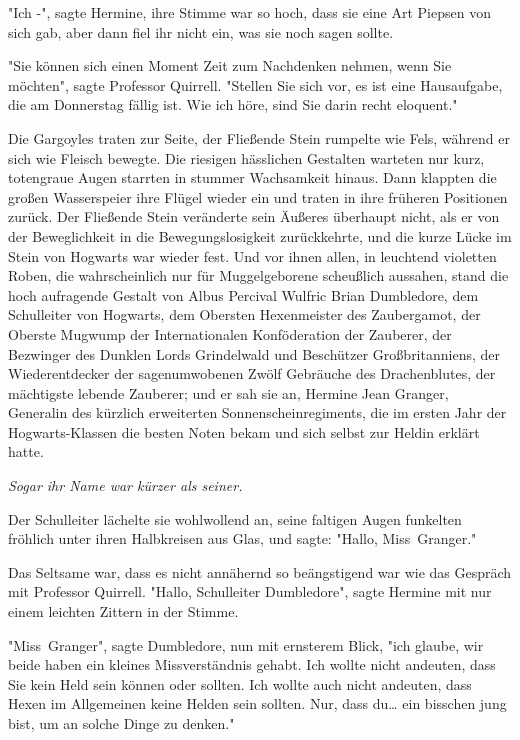 {"Ich -", sagte Hermine, ihre Stimme war so hoch, dass sie eine Art Piepsen von sich gab, aber dann fiel ihr nicht ein, was sie noch sagen sollte.

"Sie können sich einen Moment Zeit zum Nachdenken nehmen, wenn Sie möchten", sagte Professor Quirrell. "Stellen Sie sich vor, es ist eine Hausaufgabe, die am Donnerstag fällig ist. Wie ich höre, sind Sie darin recht eloquent."

Die Gargoyles traten zur Seite, der Fließende Stein rumpelte wie Fels, während er sich wie Fleisch bewegte. Die riesigen hässlichen Gestalten warteten nur kurz, totengraue Augen starrten in stummer Wachsamkeit hinaus. Dann klappten die großen Wasserspeier ihre Flügel wieder ein und traten in ihre früheren Positionen zurück. Der Fließende Stein veränderte sein Äußeres überhaupt nicht, als er von der Beweglichkeit in die Bewegungslosigkeit zurückkehrte, und die kurze Lücke im Stein von Hogwarts war wieder fest. Und vor ihnen allen, in leuchtend violetten Roben, die wahrscheinlich nur für Muggelgeborene scheußlich aussahen, stand die hoch aufragende Gestalt von Albus Percival Wulfric Brian Dumbledore, dem Schulleiter von Hogwarts, dem Obersten Hexenmeister des Zaubergamot, der Oberste Mugwump der Internationalen Konföderation der Zauberer, der Bezwinger des Dunklen Lords Grindelwald und Beschützer Großbritanniens, der Wiederentdecker der sagenumwobenen Zwölf Gebräuche des Drachenblutes, der mächtigste lebende Zauberer; und er sah sie an, Hermine Jean Granger, Generalin des kürzlich erweiterten Sonnenscheinregiments, die im ersten Jahr der Hogwarts-Klassen die besten Noten bekam und sich selbst zur Heldin erklärt hatte.

\emph{Sogar ihr Name war kürzer als seiner.}

Der Schulleiter lächelte sie wohlwollend an, seine faltigen Augen funkelten fröhlich unter ihren Halbkreisen aus Glas, und sagte: "Hallo, Miss~Granger."

Das Seltsame war, dass es nicht annähernd so beängstigend war wie das Gespräch mit Professor Quirrell. "Hallo, Schulleiter Dumbledore", sagte Hermine mit nur einem leichten Zittern in der Stimme.

"Miss~Granger", sagte Dumbledore, nun mit ernsterem Blick, "ich glaube, wir beide haben ein kleines Missverständnis gehabt. Ich wollte nicht andeuten, dass Sie kein Held sein können oder sollten. Ich wollte auch nicht andeuten, dass Hexen im Allgemeinen keine Helden sein sollten. Nur, dass du… ein bisschen jung bist, um an solche Dinge zu denken."

}
